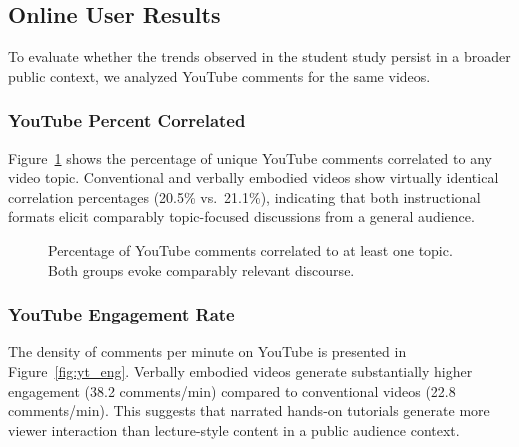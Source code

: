 \documentclass[fleqn,10pt]{JLA_article} %
\begin{document}
\subsection{Online User Results}
To evaluate whether the trends observed in the student study persist in a broader public context, we analyzed YouTube comments for the same videos.

\subsubsection{YouTube Percent Correlated}
Figure~\ref{fig:yt_corr} shows the percentage of unique YouTube comments correlated to any video topic. Conventional and verbally embodied videos show virtually identical correlation percentages (20.5\% vs.\ 21.1\%), indicating that both instructional formats elicit comparably topic-focused discussions from a general audience.

\begin{figure}[h!]
    \centering
    \caption{Percentage of YouTube comments correlated to at least one topic. Both groups evoke comparably relevant discourse.}
    \label{fig:yt_corr}
\end{figure}

\subsubsection{YouTube Engagement Rate}
The density of comments per minute on YouTube is presented in Figure~\ref{fig:yt_eng}. Verbally embodied videos generate substantially higher engagement (38.2 comments/min) compared to conventional videos (22.8 comments/min). This suggests that narrated hands-on tutorials generate more viewer interaction than lecture-style content in a public audience context.
\end{document}
